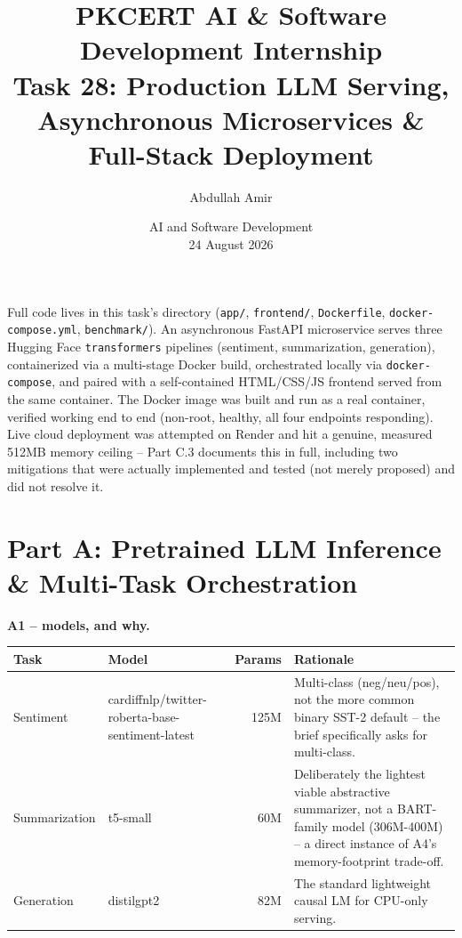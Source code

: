 \documentclass[11pt,a4paper]{article}
\title{\vspace{-1.5cm}\textbf{PKCERT AI \& Software Development Internship \\ Task 28: Production LLM Serving, Asynchronous Microservices \& Full-Stack Deployment}}
\author{Abdullah Amir}
\date{AI and Software Development \\ 24 August 2026}
\begin{document}
\maketitle
\vspace{-0.8cm}

Full code lives in this task's directory (\texttt{app/}, \texttt{frontend/}, \texttt{Dockerfile},
\texttt{docker-compose.yml}, \texttt{benchmark/}). An asynchronous FastAPI microservice serves
three Hugging Face \texttt{transformers} pipelines (sentiment, summarization, generation),
containerized via a multi-stage Docker build, orchestrated locally via \texttt{docker-compose},
and paired with a self-contained HTML/CSS/JS frontend served from the same container. The
Docker image was built and run as a real container, verified working end to end (non-root,
healthy, all four endpoints responding). Live cloud deployment was attempted on Render and
hit a genuine, measured 512MB memory ceiling -- Part C.3 documents this in full, including two
mitigations that were actually implemented and tested (not merely proposed) and did not
resolve it.

\section*{Part A: Pretrained LLM Inference \& Multi-Task Orchestration}

\textbf{A1 -- models, and why.}

\begin{table}[H]
\centering
\small
\begin{tabular}{@{}p{1.7cm}p{4.1cm}rp{6.8cm}@{}}
\toprule
\textbf{Task} & \textbf{Model} & \textbf{Params} & \textbf{Rationale} \\
\midrule
Sentiment & \raggedright cardiffnlp/twitter-\allowbreak roberta-base-\allowbreak sentiment-latest & 125M & Multi-class (neg/neu/pos), not the more common binary SST-2 default -- the brief specifically asks for multi-class. \\[0.4em]
Summarization & \raggedright t5-small & 60M & Deliberately the lightest viable abstractive summarizer, not a BART-family model (306M-400M) -- a direct instance of A4's memory-footprint trade-off. \\[0.4em]
Generation & \raggedright distilgpt2 & 82M & The standard lightweight causal LM for CPU-only serving. \\
\bottomrule
\end{tabular}
\end{table}
\end{document}
